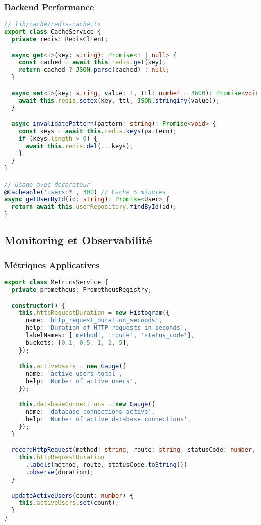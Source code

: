 \subsubsection{Backend Performance}

\begin{lstlisting}[language=TypeScript, caption=Caching strategy]
// lib/cache/redis-cache.ts
export class CacheService {
  private redis: RedisClient;

  async get<T>(key: string): Promise<T | null> {
    const cached = await this.redis.get(key);
    return cached ? JSON.parse(cached) : null;
  }

  async set<T>(key: string, value: T, ttl: number = 3600): Promise<void> {
    await this.redis.setex(key, ttl, JSON.stringify(value));
  }

  async invalidatePattern(pattern: string): Promise<void> {
    const keys = await this.redis.keys(pattern);
    if (keys.length > 0) {
      await this.redis.del(...keys);
    }
  }
}

// Usage avec décorateur
@Cacheable('users:*', 300) // Cache 5 minutes
async getUserById(id: string): Promise<User> {
  return await this.userRepository.findById(id);
}
\end{lstlisting}

\subsection{Monitoring et Observabilité}

\subsubsection{Métriques Applicatives}

\begin{lstlisting}[language=TypeScript, caption=Service de métriques]
export class MetricsService {
  private prometheus: PrometheusRegistry;

  constructor() {
    this.httpRequestDuration = new Histogram({
      name: 'http_request_duration_seconds',
      help: 'Duration of HTTP requests in seconds',
      labelNames: ['method', 'route', 'status_code'],
      buckets: [0.1, 0.5, 1, 2, 5],
    });

    this.activeUsers = new Gauge({
      name: 'active_users_total',
      help: 'Number of active users',
    });

    this.databaseConnections = new Gauge({
      name: 'database_connections_active',
      help: 'Number of active database connections',
    });
  }

  recordHttpRequest(method: string, route: string, statusCode: number, duration: number) {
    this.httpRequestDuration
      .labels(method, route, statusCode.toString())
      .observe(duration);
  }

  updateActiveUsers(count: number) {
    this.activeUsers.set(count);
  }
}
\end{lstlisting}

